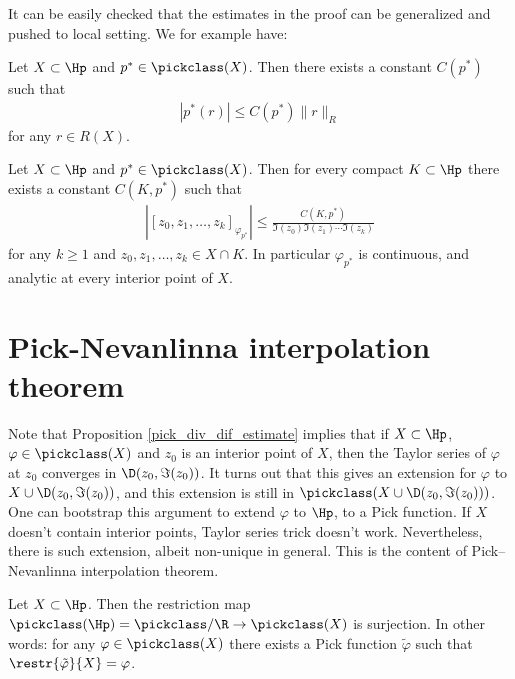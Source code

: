 It can be easily checked that the estimates in the proof can be generalized and pushed to local setting. We for example have:
\begin{lem}\label{general_pick_norm_estimate}
	Let $X \subset \Hp$ and $p^{*} \in \pickclass(X)$. Then there exists a constant $C(p^{*})$ such that
	\begin{align*}
		\left|p^{*} (r)\right| \leq C(p^{*}) \|r\|_{R}
	\end{align*}
	for any $r \in R(X)$.
\end{lem}
\begin{prop}\label{pick_div_dif_estimate}
	Let $X \subset \Hp$ and $p^{*} \in \pickclass(X)$. Then for every compact $K \subset \Hp$ there exists a constant $C(K, p^{*})$ such that
	\begin{align*}
		\left|[z_{0}, z_{1}, \ldots, z_{k}]_{\varphi_{p^{*}}}\right| \leq \frac{C(K, p^{*})}{\Im(z_{0}) \Im(z_{1}) \cdots \Im(z_{k})}
	\end{align*}
	for any $k \geq 1$ and $z_{0}, z_{1}, \ldots, z_{k} \in X \cap K$. In particular $\varphi_{p^{*}}$ is continuous, and analytic at every interior point of $X$.
\end{prop}

\section{Pick-Nevanlinna interpolation theorem}

Note that Proposition \ref{pick_div_dif_estimate} implies that if $X \subset \Hp$, $\varphi \in \pickclass(X)$ and $z_{0}$ is an interior point of $X$, then the Taylor series of $\varphi$ at $z_{0}$ converges in $\D(z_{0}, \Im(z_{0}))$. It turns out that this gives an extension for $\varphi$ to $X \cup \D(z_{0}, \Im(z_{0}))$, and this extension is still in $\pickclass(X \cup \D(z_{0}, \Im(z_{0})))$. One can bootstrap this argument to extend $\varphi$ to $\Hp$, to a Pick function. If $X$ doesn't contain interior points, Taylor series trick doesn't work. Nevertheless, there is such extension, albeit non-unique in general. This is the content of Pick--Nevanlinna interpolation theorem.

\begin{lause}\label{pick_interpolation}
	Let $X \subset \Hp$. Then the restriction map $\pickclass(\Hp) = \pickclass/\R \to \pickclass(X)$ is surjection. In other words: for any $\varphi \in \pickclass(X)$ there exists a Pick function $\tilde{\varphi}$ such that $\restr{\tilde{\varphi}}{X} = \varphi$.
\end{lause}

